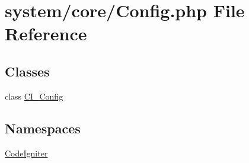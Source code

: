 \hypertarget{_config_8php}{}\section{system/core/\+Config.php File Reference}
\label{_config_8php}
\subsection*{Classes}
\begin{DoxyCompactItemize}
\item 
class \mbox{\hyperlink{class_c_i___config}{C\+I\+\_\+\+Config}}
\end{DoxyCompactItemize}
\subsection*{Namespaces}
\begin{DoxyCompactItemize}
\item 
 \mbox{\hyperlink{namespace_code_igniter}{Code\+Igniter}}
\end{DoxyCompactItemize}
